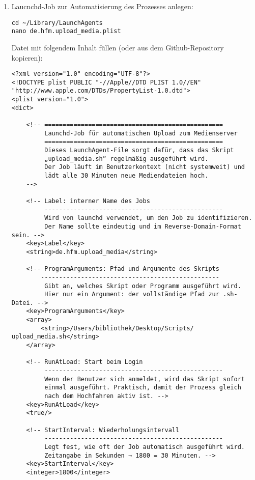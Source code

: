 \documentclass[12pt,a4paper]{report}
\begin{document}
\begin{enumerate}
    \item Laucnchd-Job zur Automatisierung des Prozesses anlegen:
    \begin{verbatim}
cd ~/Library/LaunchAgents
nano de.hfm.upload_media.plist
    \end{verbatim}

    Datei mit folgendem Inhalt füllen (oder aus dem Github-Repository kopieren):

    \begin{verbatim}
<?xml version="1.0" encoding="UTF-8"?>
<!DOCTYPE plist PUBLIC "-//Apple//DTD PLIST 1.0//EN" "http://www.apple.com/DTDs/PropertyList-1.0.dtd">
<plist version="1.0">
<dict>

    <!-- =================================================
         Launchd-Job für automatischen Upload zum Medienserver
         =================================================
         Dieses LaunchAgent-File sorgt dafür, dass das Skript
         „upload_media.sh“ regelmäßig ausgeführt wird.
         Der Job läuft im Benutzerkontext (nicht systemweit) und
         lädt alle 30 Minuten neue Mediendateien hoch.
    -->

    <!-- Label: interner Name des Jobs
         -------------------------------------------------
         Wird von launchd verwendet, um den Job zu identifizieren.
         Der Name sollte eindeutig und im Reverse-Domain-Format sein. -->
    <key>Label</key>
    <string>de.hfm.upload_media</string>

    <!-- ProgramArguments: Pfad und Argumente des Skripts
        -------------------------------------------------
         Gibt an, welches Skript oder Programm ausgeführt wird.
         Hier nur ein Argument: der vollständige Pfad zur .sh-Datei. -->
    <key>ProgramArguments</key>
    <array>
        <string>/Users/bibliothek/Desktop/Scripts/ upload_media.sh</string>
    </array>

    <!-- RunAtLoad: Start beim Login
         -------------------------------------------------
         Wenn der Benutzer sich anmeldet, wird das Skript sofort
         einmal ausgeführt. Praktisch, damit der Prozess gleich
         nach dem Hochfahren aktiv ist. -->
    <key>RunAtLoad</key>
    <true/>

    <!-- StartInterval: Wiederholungsintervall
         -------------------------------------------------
         Legt fest, wie oft der Job automatisch ausgeführt wird.
         Zeitangabe in Sekunden → 1800 = 30 Minuten. -->
    <key>StartInterval</key>
    <integer>1800</integer>


\end{verbatim}
\end{enumerate}
\end{document}
